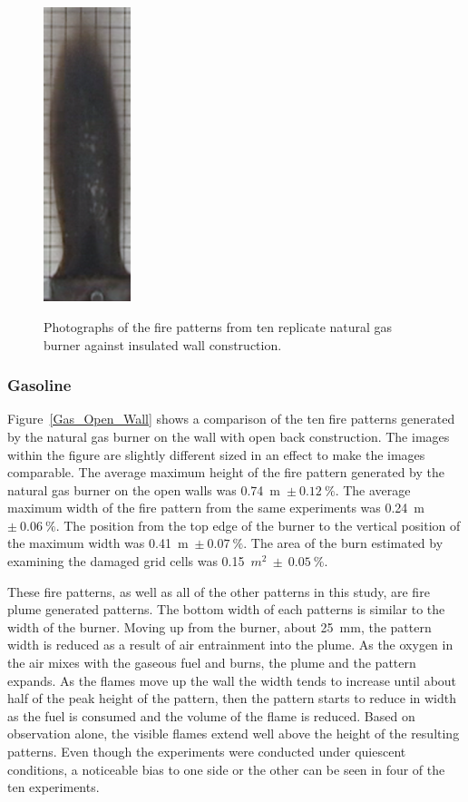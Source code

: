 \documentclass[twoside]{uocthesis}
\begin{document}
{\begin{figure}[p]
	\includegraphics[width=1.0in]{../Figures/GBNG33} \\

	\caption[Photographs of the fire patterns from ten replicate natural gas burner against insulated wall construction]{Photographs of the fire patterns from ten replicate natural gas burner against insulated wall construction.}
	\label{NG_Insulated_Wall}
\end{figure}

\subsubsection{Gasoline}

Figure~\ref{Gas_Open_Wall} shows a comparison of the ten fire patterns generated by the natural gas burner on the wall with open back construction.  The images within the figure are slightly different sized in an effect to make the images comparable.
The average maximum height of the fire pattern generated by the natural gas burner on the open walls was 0.74~m~$\pm~0.12~\%$.  The average maximum width of the fire pattern from the same experiments was 0.24~m~$\pm~0.06~\%$.  The position from the top edge of the burner to the vertical position of the maximum width was 0.41~m~$\pm~0.07~\%$. The area of the burn estimated by examining the damaged grid cells was 0.15~$m^2~\pm~0.05~\%$.  

These fire patterns, as well as all of the other patterns in this study, are fire plume generated patterns. The bottom width of each patterns is similar to the width of the burner. Moving up from the burner, about 25~mm, the pattern width is reduced as a result of air entrainment into the plume.  As the oxygen in the air mixes with the gaseous fuel and burns, the plume and the pattern expands.  As the flames move up the wall the width tends to increase until about half of the peak height of the pattern, then the pattern starts to reduce in width as the fuel is consumed and the volume of the flame is reduced.  Based on observation alone, the visible flames extend well above the height of the resulting patterns.  Even though the experiments were conducted under quiescent conditions, a noticeable bias to one side or the other can be seen in four of the ten experiments.           

}
\end{document}
